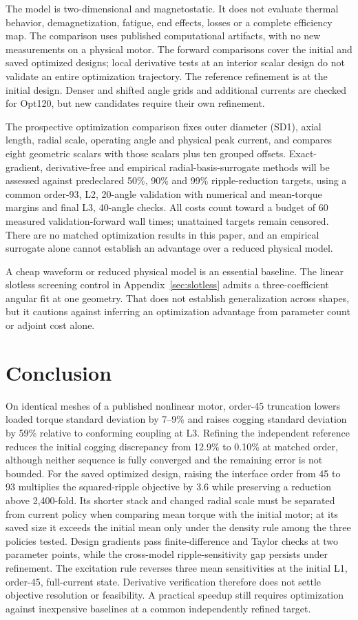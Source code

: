 \documentclass{anvil-paper}
\begin{document}
The model is two-dimensional and magnetostatic. It does not evaluate
thermal behavior, demagnetization, fatigue, end effects, losses or a
complete efficiency map. The comparison uses published computational
artifacts, with no new measurements on a physical motor. The forward comparisons cover the initial and saved optimized designs;
local derivative tests at an interior scalar design do not validate an
entire optimization trajectory. The reference refinement is at the initial
design. Denser and shifted angle grids and additional currents are checked
for Opt120, but new candidates require their own refinement.

The prospective optimization comparison fixes outer diameter (SD1), axial length,
radial scale, operating angle and physical peak current, and compares eight
geometric scalars with those scalars plus ten grouped offsets. Exact-gradient,
derivative-free and empirical radial-basis-surrogate methods will be assessed
against predeclared 50\%, 90\% and 99\% ripple-reduction targets, using a
common order-93, L2, 20-angle validation with numerical and mean-torque
margins and final L3, 40-angle checks. All costs count toward a budget of
60 measured validation-forward wall times; unattained targets remain
censored. There are no matched optimization results in this paper, and
an empirical surrogate alone cannot establish an advantage over a reduced
physical model.

A cheap waveform or reduced physical model is an essential baseline.
The linear slotless screening control in Appendix~\ref{sec:slotless}
admits a three-coefficient angular fit at one geometry. That does not
establish generalization across shapes, but it cautions against inferring
an optimization advantage from parameter count or adjoint cost alone.

\section{Conclusion}
On identical meshes of a published nonlinear motor, order-45 truncation
lowers loaded torque standard deviation by 7--9\% and raises cogging
standard deviation by 59\% relative to conforming coupling at L3.
Refining the independent reference reduces the initial cogging discrepancy
from 12.9\% to 0.10\% at matched order, although neither sequence is fully
converged and the remaining error is not bounded. For the saved optimized
design, raising the interface order from 45 to 93 multiplies the
squared-ripple objective by 3.6 while preserving a reduction above
2,400-fold. Its shorter stack and changed radial scale must be separated
from current policy when comparing mean torque with the initial motor;
at its saved size it exceeds the initial mean only under the density rule
among the three policies tested.
Design gradients pass finite-difference and Taylor checks at two parameter
points, while the cross-model ripple-sensitivity gap persists under
refinement. The excitation rule reverses three mean sensitivities at the
initial L1, order-45, full-current state. Derivative verification therefore
does not settle objective resolution or feasibility. A practical speedup
still requires optimization against inexpensive baselines at a common
independently refined target.
\end{document}
